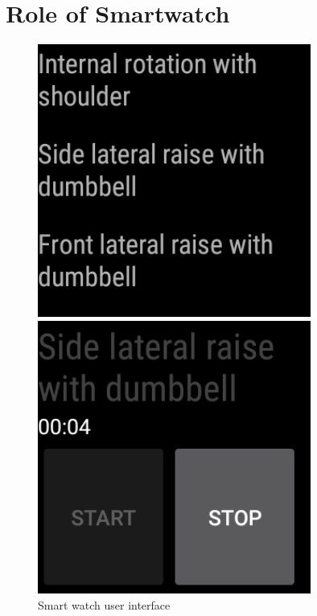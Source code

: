 \section{Role of Smartwatch}

\begin{figure}[b!]
  \centering
    \begin{minipage}{0.20\textwidth}
      \centering
        \includegraphics[width=0.80\textwidth]{00_resources/figures/Android_Watch_ListView.png}
    \end{minipage}
    \begin{minipage}{0.20\textwidth}
      \centering
        \includegraphics[width=0.80\textwidth]{00_resources/figures/Android_Watch_RecordView.png}
    \end{minipage}
  \caption{Smart watch user interface}
  \label{fig:smwui}
\end{figure}

